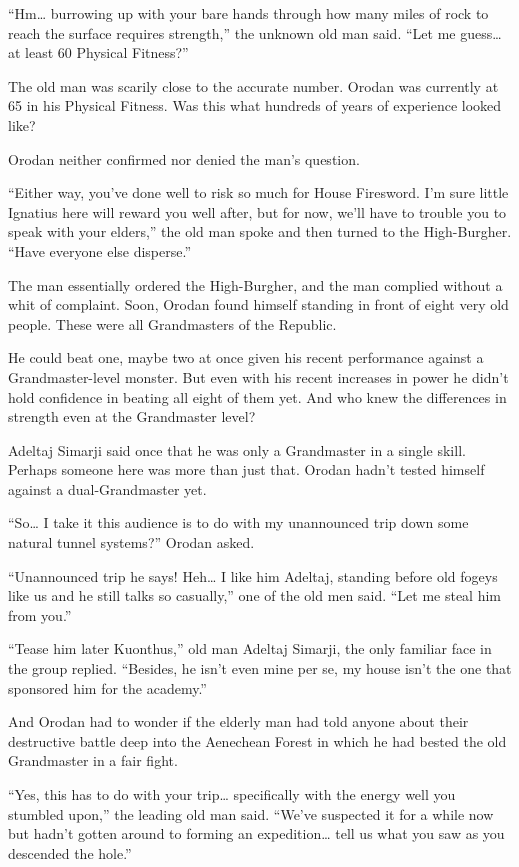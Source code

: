 \documentclass[a4paper,10pt]{book}
\begin{document}
“Hm… burrowing up with your bare hands through how many miles of rock to reach the surface requires strength,” the unknown old man said. “Let me guess… at least 60 Physical Fitness?”\par
The old man was scarily close to the accurate number. Orodan was currently at 65 in his Physical Fitness. Was this what hundreds of years of experience looked like?\par
Orodan neither confirmed nor denied the man’s question.\par
“Either way, you’ve done well to risk so much for House Firesword. I’m sure little Ignatius here will reward you well after, but for now, we’ll have to trouble you to speak with your elders,” the old man spoke and then turned to the High-Burgher. “Have everyone else disperse.”\par
The man essentially ordered the High-Burgher, and the man complied without a whit of complaint. Soon, Orodan found himself standing in front of eight very old people. These were all Grandmasters of the Republic.\par
He could beat one, maybe two at once given his recent performance against a Grandmaster-level monster. But even with his recent increases in power he didn’t hold confidence in beating all eight of them yet. And who knew the differences in strength even at the Grandmaster level?\par
Adeltaj Simarji said once that he was only a Grandmaster in a single skill. Perhaps someone here was more than just that. Orodan hadn’t tested himself against a dual-Grandmaster yet.\par
“So… I take it this audience is to do with my unannounced trip down some natural tunnel systems?” Orodan asked.\par
“Unannounced trip he says! Heh… I like him Adeltaj, standing before old fogeys like us and he still talks so casually,” one of the old men said. “Let me steal him from you.”\par
“Tease him later Kuonthus,” old man Adeltaj Simarji, the only familiar face in the group replied. “Besides, he isn’t even mine per se, my house isn’t the one that sponsored him for the academy.”\par
And Orodan had to wonder if the elderly man had told anyone about their destructive battle deep into the Aenechean Forest in which he had bested the old Grandmaster in a fair fight.\par
“Yes, this has to do with your trip… specifically with the energy well you stumbled upon,” the leading old man said. “We’ve suspected it for a while now but hadn't gotten around to forming an expedition… tell us what you saw as you descended the hole.”\par
\end{document}
